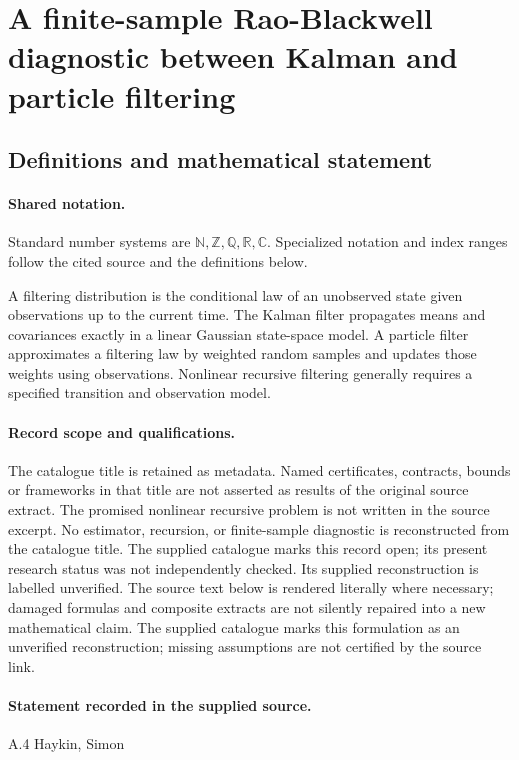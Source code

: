 \documentclass[11pt]{article}
\begin{document}
\section{A finite-sample Rao-Blackwell diagnostic between Kalman and particle filtering}\label{statement}

\subsection{Definitions and mathematical statement}

\paragraph{Shared notation.}Standard number systems are $\mathbb N,\mathbb Z,\mathbb Q,\mathbb R,\mathbb C$. Specialized notation and index ranges follow the cited source and the definitions below.


A filtering distribution is the conditional law of an unobserved state given observations up to the current time. The Kalman filter propagates means and covariances exactly in a linear Gaussian state-space model. A particle filter approximates a filtering law by weighted random samples and updates those weights using observations. Nonlinear recursive filtering generally requires a specified transition and observation model.
\paragraph{Record scope and qualifications.}
The catalogue title is retained as metadata. Named certificates, contracts, bounds or frameworks in that title are not asserted as results of the original source extract.
The promised nonlinear recursive problem is not written in the source excerpt. No estimator, recursion, or finite-sample diagnostic is reconstructed from the catalogue title. The supplied catalogue marks this record open; its present research status was not independently checked. Its supplied reconstruction is labelled unverified.
The source text below is rendered literally where necessary; damaged formulas and composite extracts are not silently repaired into a new mathematical claim.
The supplied catalogue marks this formulation as an unverified reconstruction; missing assumptions are not certified by the source link.
\paragraph{Statement recorded in the supplied source.}
A.4 Haykin, Simon
\end{document}
